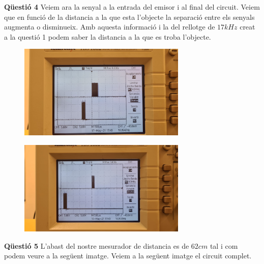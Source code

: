 \documentclass[12pt, a4papre]{article}
\begin{document}
	\textbf{Qüestió 4} Veiem ara la senyal a la entrada del emisor i al final del circuit. Veiem que en funció de la distancia a la que esta l'objecte la separació entre els senyals augmenta o disminueix. Amb aquesta informació i la del rellotge de $17kHz$ creat a la questió 1 podem saber la distancia a la que es troba l'objecte.
	
	\begin{figure}[H]
		\begin{center}
		\includegraphics[width=80mm]{p4_13.jpeg}
		\end{center}
	\end{figure}
	
	\begin{figure}[H]
		\begin{center}
		\includegraphics[width=80mm]{p4_14.jpeg}
		\end{center}
	\end{figure}
	
	\textbf{Qüestió 5} L'abast del nostre mesurador de distancia es de $62cm$ tal i com podem veure a la següent imatge. Veiem a la següent imatge el circuit complet.
	
\end{document}
